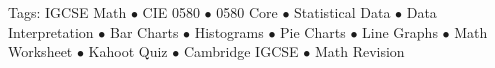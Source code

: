 \documentclass[11pt,a4paper]{article}
\begin{document}
\vspace{14pt}
\begin{center}
  \sffamily\scriptsize\textcolor{textmuted}{
    Tags: IGCSE Math $\bullet$ CIE 0580 $\bullet$ 0580 Core $\bullet$ Statistical Data $\bullet$ Data Interpretation $\bullet$ Bar Charts $\bullet$ Histograms $\bullet$ Pie Charts $\bullet$ Line Graphs $\bullet$ Math Worksheet $\bullet$ Kahoot Quiz $\bullet$ Cambridge IGCSE $\bullet$ Math Revision
  }
\end{center}
\end{document}
